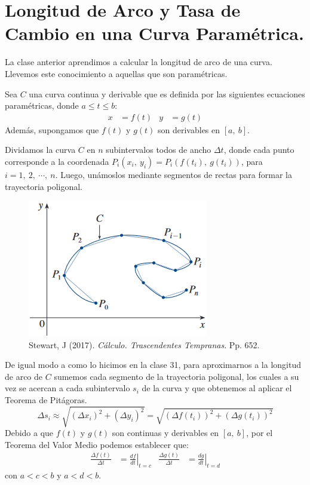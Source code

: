 \documentclass[12pt]{article}
\begin{document}
\section{Longitud de Arco y Tasa de Cambio en una Curva Paramétrica.}

La clase anterior aprendimos a calcular la longitud de arco de una curva. Llevemos este conocimiento a aquellas que son paramétricas.

Sea $C$ una curva continua y derivable que es definida por las siguientes ecuaciones paramétricas, donde $a \leq t \leq b$:
\begin{align*}
  x &= f(t) & y &= g(t)
\end{align*}
Además, supongamos que $f(t)$ y $g(t)$ son derivables en $[a, \ b]$.

Dividamos la curva $C$ en $n$ subintervalos todos de ancho $\Delta t$, donde cada punto corresponde a la coordenada $P_{i}(x_{i}, \ y_{i}) = P_{i}(f(t_{i}), \ g(t_{i}))$, para $i = 1, \ 2, \ \cdots, \ n$. Luego, unámoslos mediante segmentos de rectas para formar la trayectoria poligonal.

\begin{figure}[hbt!]
\centering
\includegraphics[scale=0.5]{longitud-de-curva-parametrica.jpg}
\caption{Stewart, J (2017). \textit{Cálculo. Trascendentes Tempranas}. Pp. 652.}
\end{figure}

De igual modo a como lo hicimos en la clase 31, para aproximarnos a la longitud de arco de $C$ sumemos cada segmento de la trayectoria poligonal, los cuales a su vez se acercan a cada subintervalo $s_{i}$ de la curva y que obtenemos al aplicar el Teorema de Pitágoras.
\[
  \Delta s_{i} \approx \sqrt{(\Delta x_{i})^{2} + (\Delta y_{i})^{2}} = \sqrt{(\Delta f(t_{i}))^{2} + (\Delta g(t_{i}))^{2}}
\]
Debido a que $f(t)$ y $g(t)$ son continuas y derivables en $[a, \ b]$, por el Teorema del Valor Medio podemos establecer que:
\begin{align*}
  \frac{\Delta f(t)}{\Delta t} &= \left. \frac{df}{dt} \right|_{t = c} & \frac{\Delta g(t)}{\Delta t} &= \left. \frac{dg}{dt} \right|_{t = d}
\end{align*}
con $a < c < b$ y $a < d < b$.
\end{document}
